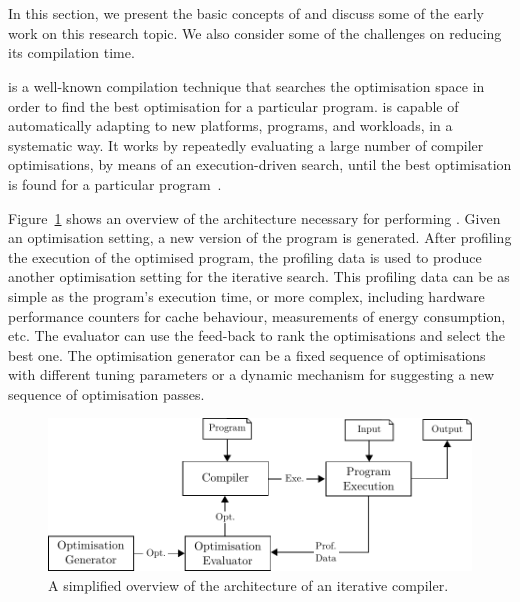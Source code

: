\section{{\IterComp}} %

In this section, we present the basic concepts of {\itercomp} and discuss some of the early work on this research topic.
We also consider some of the challenges on reducing its compilation time.

{\Itercomp} is a well-known compilation technique that searches the optimisation space in order to find the best optimisation for a particular program.
{\Itercomp} is capable of automatically adapting to new platforms, programs, and workloads, in a systematic way.
It works by repeatedly evaluating a large number of compiler optimisations, by means of an execution-driven search, until the best optimisation is found for a particular program~\citep{kisuki99,fursin07,chen10}.

Figure~\ref{fig:itercomp-diagram} shows an overview of the architecture necessary for performing {\itercomp}.
Given an optimisation setting, a new version of the program is generated.
After profiling the execution of the optimised program, the profiling data is used to produce another optimisation setting for the iterative search.
This profiling data can be as simple as the program's execution time, or more complex, including hardware performance counters for cache behaviour, measurements of energy consumption, etc.
The evaluator can use the feed-back to rank the optimisations and select the best one.
The optimisation generator can be a fixed sequence of optimisations with different tuning parameters or a dynamic mechanism for suggesting a new sequence of optimisation passes.

\begin{figure}[htb]
    \centering
    \includegraphics[width=0.8\linewidth]{src/background/figs/itercomp-diagram}
    \caption{A simplified overview of the architecture of an iterative compiler.}
    \label{fig:itercomp-diagram}
\end{figure}


